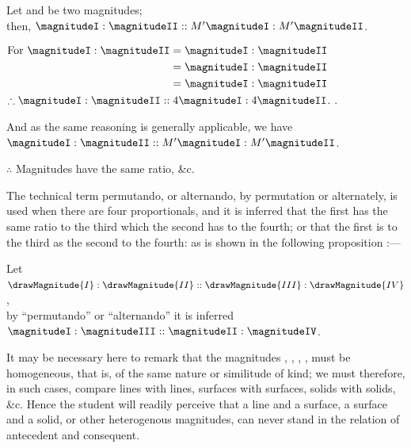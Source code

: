 \documentclass[booklanguage=english]{byrnebook}
\begin{document}
\begin{center}
Let  and  be two magnitudes;\\
then, $\magnitudeI : \magnitudeII :: M' \magnitudeI : M' \magnitudeII$.

$\begin{aligned}
\mbox{For } \magnitudeI : \magnitudeII &= \magnitudeI : \magnitudeII \\
&= \magnitudeI : \magnitudeII \\
&= \magnitudeI : \magnitudeII \\
\end{aligned}$\\
$\therefore \magnitudeI : \magnitudeII :: 4 \magnitudeI : 4 \magnitudeII$. .

And as the same reasoning is generally applicable, we have\\
$\magnitudeI : \magnitudeII :: M' \magnitudeI : M' \magnitudeII$.

$\therefore$ Magnitudes have the same ratio, \&c.
\end{center}

\vfill\pagebreak

The technical term permutando, or alternando, by permutation or alternately, is used when there are four proportionals, and it is inferred that the first has the same ratio to the third which the second has to the fourth; or that the first is to the third as the second to the fourth: as is shown in the following proposition :—

\begin{center}
Let $\drawMagnitude{I} : \drawMagnitude{II} :: \drawMagnitude{III} : \drawMagnitude{IV}$,\\
by \enquote{permutando} or \enquote{alternando} it is inferred\\
$\magnitudeI : \magnitudeIII :: \magnitudeII : \magnitudeIV$.
\end{center}

It may be necessary here to remark that the magnitudes \magnitudeI, \magnitudeII, \magnitudeIII, \magnitudeIV, must be homogeneous, that is, of the same nature or similitude of kind; we must therefore, in such cases, compare lines with lines, surfaces with surfaces, solids with solids, \&c. Hence the student will readily perceive that a line and a surface, a surface and a solid, or other heterogenous magnitudes, can never stand in the relation of antecedent and consequent.
\end{document}
